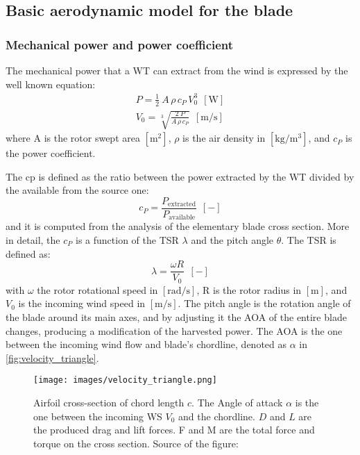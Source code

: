 \subsection{Basic aerodynamic model for the blade}
\subsubsection{Mechanical power and power coefficient}\label{subsec:mech_pow_and_pow_coeff}
The mechanical power that a \acrshort{WT} can extract from the wind is expressed by the well known equation:
\begin{gather}
    P = \frac{1}{2}\ A \, \rho \, c_P \, V_0^3 \ \ \left[\si{\watt}\right] \label{eq:power} \\
    V_0 = \sqrt[3]{\frac{2 \ P}{A \, \rho \, c_P}} \ \ \left[\si{\meter \per \second}\right] 
\end{gather}
where A is the rotor swept area $\left[\si{\square \meter}\right]$, $\rho$ is the air density in $\left[\si{\kilo\gram\per\cubic\meter}\right]$, and $c_P$ is the power coefficient. 

The \acrfull{cp} is defined as the ratio between the power extracted by the \acrshort{WT} divided by the available from the source one:
\begin{equation}
    c_P = \frac{P_{\text{extracted}}}{P_{\text{available}}} \ \ \left[-\right]
    \label{eq:c_P}
\end{equation}
and it is computed from the analysis of the elementary blade cross section. More in detail, the $c_P$ is a function of the \acrfull{TSR} $\lambda$ and the pitch angle $\theta$. The \acrshort{TSR} is defined as:
\begin{equation}
    \lambda = \frac{\omega R}{V_0} \ \ \left[-\right]
    \label{eq:TSR}
\end{equation}
with $\omega$ the rotor rotational speed in $\left[\si{\radian \per \second}\right]$, R is the rotor radius in $\left[\si{\meter}\right]$, and $V_0$ is the incoming wind speed in  $\left[\si{\meter \per \second}\right]$. The pitch angle is the rotation angle of the blade around its main axes, and by adjusting it the \acrfull{AOA} of the entire blade changes, producing a modification of the harvested power. The \acrshort{AOA} is the one between the incoming wind flow and blade's chordline, denoted as $\alpha$ in \autoref{fig:velocity_triangle}. 
\begin{figure}[htb]
    \centering
    \texttt{[image: images/velocity\_triangle.png]}
    \caption{Airfoil cross-section of chord length $c$. The Angle of attack $\alpha$ is the one between the incoming \acrshort{WS} $V_0$ and the chordline. $D$ and $L$ are the produced drag and lift forces. F and M are the total force and torque on the cross section. Source of the figure: \cite{Aerodynamics_of_wind_turbines}}
    \label{fig:velocity_triangle}
\end{figure}

